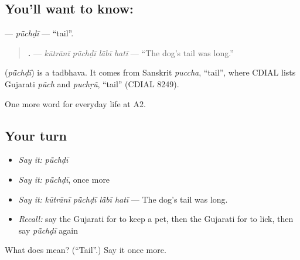 \subsection*{You'll want to know: }
\textbf{} — \emph{pū̃chḍī} — \textquotedblleft{}tail\textquotedblright{}.

\begin{quote}
\textbf{   .} — \emph{kūtrānī pū̃chḍī lā̃bī hatī} — \textquotedblleft{}The dog's tail was long.\textquotedblright{}
\end{quote}

\begin{cousinweb}
\textbf{} (\emph{pū̃chḍī}) is a tadbhava. It comes from Sanskrit \emph{puccha}, \textquotedblleft{}tail\textquotedblright{}, where CDIAL lists Gujarati \emph{pũch} and \emph{puchṛũ}, \textquotedblleft{}tail\textquotedblright{} (CDIAL 8249).
\end{cousinweb}

\begin{grammarlens}[title={What you've built}]
One more word for everyday life at A2.
\end{grammarlens}

\subsection*{Your turn}
\begin{itemize}
\raggedright
  \item \emph{Say it:} \emph{pū̃chḍī}
  \item \emph{Say it:} \emph{pū̃chḍī}, once more
  \item \emph{Say it:} \emph{kūtrānī pū̃chḍī lā̃bī hatī} — The dog's tail was long.
  \item \emph{Recall:} say the Gujarati for to keep a pet, then the Gujarati for to lick, then say \emph{pū̃chḍī} again
\end{itemize}

\begin{tcolorbox}[breakable,colback=teal!4,colframe=teal!35!black,title={Before you move on}]
What does  mean? (\textquotedblleft{}Tail\textquotedblright{}.) Say it once more.
\end{tcolorbox}
